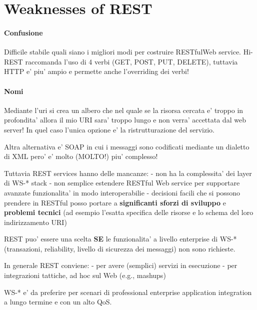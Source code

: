 \section{Weaknesses of REST}
\paragraph{Confusione}
Difficile stabile quali siano i migliori modi per costruire RESTfulWeb service. Hi-REST raccomanda l'uso di 4 verbi (GET, POST, PUT, DELETE),
tuttavia HTTP e' piu' ampio e permette anche l'overriding dei verbi!
\paragraph{Nomi}
Mediante l'uri si crea un albero che nel quale se la risorsa cercata e' troppo in profondita' allora il mio URI sara' troppo lungo e non verra'
accettata dal web server! In quel caso l'unica opzione e' la ristrutturazione del servizio.

Altra alternativa e' SOAP in cui i messaggi sono codificati mediante un dialetto di XML pero' e' molto (MOLTO!) piu' complesso!

Tuttavia \gls{REST} services hanno delle mancanze:
- non ha la complessita' dei layer di WS-* stack
- non semplice estendere RESTful Web service per supportare avanzate funzionalita' in modo interoperabilie
- decisioni facili che si possono prendere in RESTful posso portare a \textbf{significanti sforzi di sviluppo} e \textbf{problemi tecnici}
(ad esempio l'esatta specifica delle risorse e lo schema del loro indirizzamento URI)

\gls{REST} puo' essere una scelta \textbf{SE} le funzionalita' a livello enterprise di WS-* (transazioni, reliability, livello di sicurezza
dei messaggi) non sono richieste.

In generale \gls{REST} conviene:
- per avere (semplici) servizi in esecuzione
- per integrazioni tattiche, ad hoc sul Web (e.g., mashups)

WS-* e' da preferire per scenari di professional enterprise application integration a lungo termine e con un alto \gls{QoS}.
